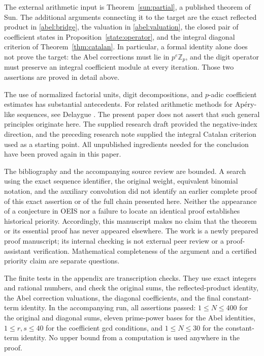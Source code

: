 \documentclass[11pt,a4paper]{article}
\theoremstyle{remark}\newtheorem{remark}[theorem]{Remark}
\newcommand{\Z}{\mathbb Z}\newcommand{\Q}{\mathbb Q}
\begin{document}
The external arithmetic input is Theorem~\ref{sun:partial}, a published
theorem of Sun. The additional arguments connecting it to the target are
the exact reflected product in \eqref{abel:bridge}, the valuation in
\eqref{abel:valuation}, the closed pair of coefficient states in
Proposition~\ref{state:operator}, and the integral diagonal criterion
of Theorem~\ref{thm:catalan}. In particular, a formal identity alone
does not prove the target: the Abel corrections must lie in \(p^e\Z_p\),
and the digit operator must preserve an integral coefficient module
at every iteration. Those two assertions are proved in detail above.

The use of normalized factorial units, digit decompositions, and
\(p\)-adic coefficient estimates has substantial antecedents. For
related arithmetic methods for Ap\'ery-like sequences, see Delaygue
\cite{Delaygue}. The present paper does not assert that such general
principles originate here. The supplied research draft \cite{Supplied}
provided the negative-index direction, and the preceding research note
\cite{Previous} supplied the integral Catalan criterion used as a
starting point. All unpublished ingredients needed for the conclusion
have been proved again in this paper.

The bibliography and the accompanying source review are bounded.
A search using the exact sequence identifier, the original weight,
equivalent binomial notation, and the auxiliary convolution did not
identify an earlier complete proof of this exact assertion or of the
full chain presented here.
Neither the appearance of a conjecture in OEIS nor a failure to locate
an identical proof establishes historical priority. Accordingly, this
manuscript makes no claim that the theorem or its essential proof has
never appeared elsewhere. The work is a newly prepared proof manuscript;
its internal checking is not external peer review or a proof-assistant
verification. Mathematical completeness of the argument and a certified
priority claim are separate questions.

The finite tests in the appendix are transcription checks. They use
exact integers and rational numbers, and check the original sums, the
reflected-product identity, the Abel correction valuations, the diagonal
coefficients, and the final constant-term identity. In the accompanying
run, all assertions passed: \(1\le N\le400\) for the original and
diagonal sums, eleven prime-power bases for the Abel identities,
\(1\le r,s\le40\) for the coefficient gcd conditions, and
\(1\le N\le30\) for the constant-term identity.
No upper bound from a computation is used anywhere in the proof.
\end{document}
